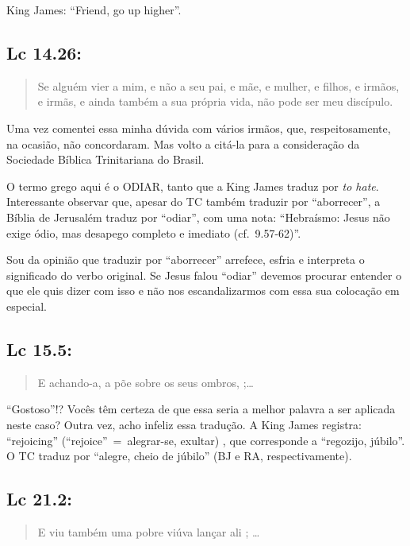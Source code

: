 King James: ``Friend, go up higher''.


\subsection*{Lc 14.26:}

\begin{quote}
    \small
Se alguém vier a mim, e não  a seu pai, e mãe, e mulher, e filhos, e irmãos, e irmãs, e ainda também a sua própria vida, não pode ser meu discípulo.
\end{quote}

Uma vez comentei essa minha dúvida com vários irmãos, que,
respeitosamente, na ocasião, não concordaram. Mas volto a citá-la
para a consideração da Sociedade Bíblica Trinitariana do Brasil.

O termo grego aqui é o ODIAR, tanto que a King James traduz por
\textit{to hate}. Interessante observar que, apesar do TC também traduzir por
``aborrecer'', a Bíblia de Jerusalém traduz por ``odiar'', com uma
nota: ``Hebraísmo: Jesus não exige ódio, mas desapego completo e
imediato (cf.~9.57-62)''.

Sou da opinião que traduzir por ``aborrecer'' arrefece, esfria e interpreta o significado do verbo original. Se Jesus falou ``odiar'' devemos procurar entender o que ele quis dizer com isso e não nos escandalizarmos com essa sua colocação em especial.

\subsection*{Lc 15.5:}
\begin{quote}
    \small
E achando-a, a põe sobre os seus ombros, ;\ldots
\end{quote}

``Gostoso''!? Vocês têm certeza de que essa seria a melhor palavra a
ser aplicada neste caso? Outra vez, acho infeliz essa tradução. A King
James registra: ``rejoicing'' (``rejoice''~=~alegrar-se, exultar) ,
que corresponde a ``regozijo, júbilo''. O TC traduz por ``alegre,
cheio de júbilo'' (BJ e RA, respectivamente).

\subsection*{Lc 21.2:}
\begin{quote}
    \small
E viu também uma pobre viúva lançar ali ; \ldots
\end{quote}

